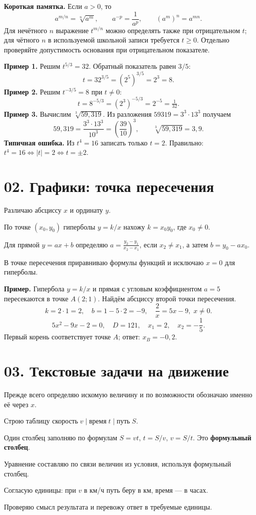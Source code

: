 \documentclass[a4paper,12pt]{article}
\newcommand{\key}[1]{\textcolor{darkaccent}{\bfseries #1}}
\newcommand{\ruleline}{\par\vspace{0.25em}{\color{accent!70}\hrule height 0.6pt}\vspace{0.7em}}
\newcommand{\checkitem}[1]{\item[$\square$] #1}
\begin{document}
\key{Короткая памятка.} Если \(a>0\), то
\[
 a^{m/n}=\sqrt[n]{a^m},\qquad a^{-p}=\frac1{a^p},\qquad
 (a^m)^n=a^{mn}.
\]
Для нечётного \(n\) выражение \(t^{m/n}\) можно определять также при отрицательном \(t\); для чётного \(n\) в используемой школьной записи требуется \(t\ge0\). Отдельно проверяйте допустимость основания при отрицательном показателе.

\key{Пример 1.} Решим \(t^{5/3}=32\). Обратный показатель равен \(3/5\):
\[
 t=32^{3/5}=(2^5)^{3/5}=2^3=\boxed{8}.
\]
\key{Пример 2.} Решим \(t^{-3/5}=8\) при \(t\ne0\):
\[
 t=8^{-5/3}=(2^3)^{-5/3}=2^{-5}=\boxed{\tfrac1{32}}.
\]
\key{Пример 3.} Вычислим \(\sqrt[3]{59{,}319}\). Из разложения \(59319=3^3\cdot13^3\) получаем
\[
 59{,}319=\frac{3^3\cdot13^3}{10^3}
 =\left(\frac{39}{10}\right)^3,
 \qquad \sqrt[3]{59{,}319}=\boxed{3{,}9}.
\]
\key{Типичная ошибка.} Из \(t^4=16\) записать только \(t=2\). Правильно: \(t^4=16\iff |t|=2\iff t=\pm2\).

\clearpage
\section*{02. Графики: точка пересечения}
\ruleline
\begin{checklist}
\checkitem{Различаю абсциссу \(x\) и ординату \(y\).}
\checkitem{По точке \((x_0,y_0)\) гиперболы \(y=k/x\) нахожу \(k=x_0y_0\), где \(x_0\ne0\).}
\checkitem{Для прямой \(y=ax+b\) определяю \(a=\frac{y_2-y_1}{x_2-x_1}\), если \(x_2\ne x_1\), а затем \(b=y_0-ax_0\).}
\checkitem{В точке пересечения приравниваю формулы функций и исключаю \(x=0\) для гиперболы.}
\end{checklist}

\key{Пример.} Гипербола \(y=k/x\) и прямая с угловым коэффициентом \(a=5\) пересекаются в точке \(A(2;1)\). Найдём абсциссу второй точки пересечения.
\[
 k=2\cdot1=2,\quad b=1-5\cdot2=-9,
 \quad \frac2x=5x-9,\; x\ne0.
\]
\[
 5x^2-9x-2=0,\quad D=121,\quad x_1=2,\quad x_2=-\frac15.
\]
Первый корень соответствует точке \(A\); ответ: \(\boxed{x_B=-0{,}2}\).

\section*{03. Текстовые задачи на движение}
\ruleline
\begin{checklist}
\checkitem{Прежде всего определяю искомую величину и по возможности обозначаю именно её через \(x\).}
\checkitem{Строю таблицу \(\text{скорость}\;v\mid\text{время}\;t\mid\text{путь}\;S\).}
\checkitem{Один столбец заполняю по формулам \(S=vt\), \(t=S/v\), \(v=S/t\). Это \textbf{формульный столбец}.}
\checkitem{Уравнение составляю по связи величин из условия, используя формульный столбец.}
\checkitem{Согласую единицы: при \(v\) в км/ч путь беру в км, время — в часах.}
\checkitem{Проверяю смысл результата и перевожу ответ в требуемые единицы.}
\end{checklist}
\end{document}
